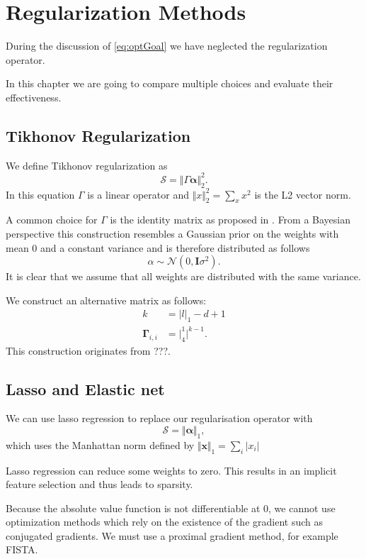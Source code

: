 \chapter{Regularization Methods}
During the discussion of \autoref{eq:optGoal} we have neglected the regularization
operator.

In this chapter we are going to compare multiple choices and evaluate their effectiveness.

\section{Tikhonov Regularization}
We define Tikhonov regularization as 
\begin{equation}
\mathcal{S} = \Vert \Gamma \bm{\alpha} \Vert_2^2.
\end{equation}
In this equation \(\Gamma\) is a linear operator
and \(\Vert x \Vert_2^2 = \sum_x x^2\) is the L2 vector norm.

A common choice for \(\Gamma\) is the identity matrix as proposed in \cite{SpatAdaptGrid}.
From a Bayesian perspective this construction resembles a Gaussian prior on the weights with mean 0 and
a constant variance and is therefore distributed as follows
\begin{equation}
\alpha \sim \mathcal{N} (0, \bm{I} \sigma^2 ).
\end{equation}
It is clear that we assume that all weights are distributed with the same variance. 

We construct an alternative matrix as follows:
\begin{align}
  \label{eq:diagonalMatrix}
k & = \vert l \vert_1 - d + 1 \\
\bm{\Gamma}_{i,i} & = \vert ^1_4\vert^{k-1}.
\end{align}
This construction originates from ???.

\section{Lasso and Elastic net}
We can use lasso regression to replace our regularisation operator with 
\begin{equation}
\mathcal{S} = \Vert \bm{\alpha} \Vert_1,
\end{equation}
which uses the Manhattan norm defined by \(\Vert \bm{x} \Vert_1 = \sum_i \vert x_i \vert\)

Lasso regression can reduce some weights to zero. 
This results in an implicit feature selection and thus leads to sparsity.

Because the absolute value function is not differentiable at \(0\), we cannot use
optimization methods which rely on the existence of the gradient such as
conjugated gradients.
We must use a proximal gradient method, for example FISTA.



